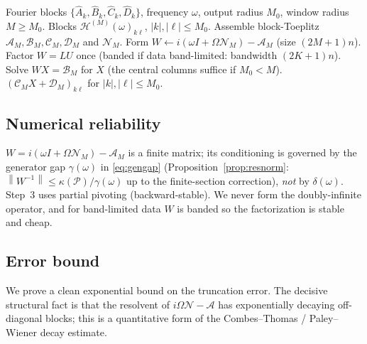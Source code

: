 \documentclass{amsart}
\theoremstyle{definition}
\newcommand{\norm}[1]{\left\lVert#1\right\rVert}
\newcommand{\Acal}{\mathcal{A}}
\newcommand{\Bcal}{\mathcal{B}}
\newcommand{\Ccal}{\mathcal{C}}
\newcommand{\Dcal}{\mathcal{D}}
\newcommand{\Hcal}{\mathcal{H}}
\newcommand{\Ncal}{\mathcal{N}}
\begin{document}
\begin{algorithm}[H]
\caption{Truncated harmonic-balance HTF at one frequency}\label{alg:trunc}
\begin{algorithmic}[1]
\Require Fourier blocks $\{\hat A_k,\hat B_k,\hat C_k,\hat D_k\}$, frequency $\omega$,
output radius $M_0$, window radius $M\ge M_0$.
\Ensure Blocks $\Hcal^{(M)}(\omega)_{k\ell}$, $|k|,|\ell|\le M_0$.
\State Assemble block-Toeplitz $\Acal_M,\Bcal_M,\Ccal_M,\Dcal_M$ and $\Ncal_M$.
\State Form $W\gets i(\omega I+\Omega\Ncal_M)-\Acal_M$ (size $(2M{+}1)n$).
\State Factor $W=LU$ once (banded if data band-limited: bandwidth $(2K{+}1)n$).
\State Solve $WX=\Bcal_M$ for $X$ (the central columns suffice if $M_0<M$).
\State \Return $(\Ccal_M X+\Dcal_M)_{k\ell}$ for $|k|,|\ell|\le M_0$.
\end{algorithmic}
\end{algorithm}

\subsection{Numerical reliability}
$W=i(\omega I+\Omega\Ncal_M)-\Acal_M$ is a finite matrix; its conditioning is
governed by the generator gap $\gamma(\omega)$ in \eqref{eq:gengap}
(Proposition~\ref{prop:resnorm}: $\norm{W^{-1}}\le\kappa(\mathcal P)/\gamma(\omega)$ up to the finite-section correction), \emph{not} by $\delta(\omega)$. Step~3 uses partial pivoting
(backward-stable). We never form the doubly-infinite operator, and for
band-limited data $W$ is banded so the factorization is stable and cheap.

\subsection{Error bound}
We prove a clean exponential bound on the truncation error. The decisive
structural fact is that the resolvent of $i\Omega\Ncal-\Acal$ has
exponentially decaying off-diagonal blocks; this is a quantitative form of the
Combes--Thomas / Paley--Wiener decay estimate.
\end{document}
